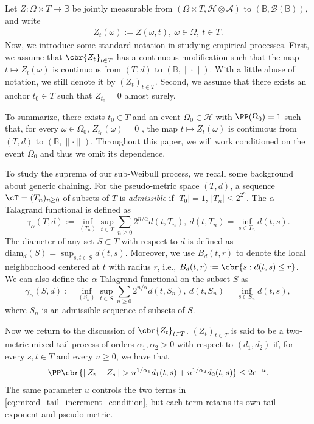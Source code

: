 \documentclass[11pt]{article}
\begin{document}
Let $Z:\Omega\times T\longrightarrow\mathbb B$ be jointly measurable
from $(\Omega\times T,\mathcal H\otimes\mathcal A)$ to
$(\mathbb B,\mathcal B(\mathbb B))$, and write
\begin{align*}
Z_t(\omega):=Z(\omega,t),
\ \omega\in\Omega,\ t\in T.
\end{align*}
Now, we introduce some standard notation in studying empirical processes. First, we assume that $\cbr{Z_t}_{t\in T}$ has a continuous modification such that the map $t\mapsto Z_t(\omega)$ is continuous from $(T,d)$ to $(\mathbb B,\|\cdot\|)$. With a little abuse of notation, we still denote it by
$(Z_t)_{t\in T}$. Second, we assume that there exists an anchor $t_0\in T$ such that $Z_{t_0}=0$ almost surely.

To summarize, there exists $t_0\in T$ and an event
$\Omega_0\in\mathcal H$ with $\PP(\Omega_0)=1$ such that, for every
$\omega\in\Omega_0$, $Z_{t_0}(\omega)=0$
, the map $t\mapsto Z_t(\omega)$ 
is continuous from $(T,d)$ to $(\mathbb B,\|\cdot\|)$. Throughout this paper, we will work conditioned on the event $\Omega_0$ and thus we omit its dependence.



To study the suprema of our sub-Weibull process, we recall some background about generic chaining.
For the pseudo-metric space $(T,d)$, a sequence $\cT=(T_n)_{n\ge 0}$ of subsets of $T$ is \emph{admissible} if $|T_0|=1$, $|T_n|\le 2^{2^n}$. The $\alpha$-Talagrand functional \citep{dirksen2015tail} is defined as
\[
\gamma_{\alpha}(T,d):=\inf_{(T_n)}\sup_{t\in T}\sum_{n\ge 0}2^{n/\alpha}d(t,T_n),\ d(t,T_n)=\inf_{s\in T_n}d(t,s).
\]
The diameter of any set $S\subset T$ with respect to $d$ is defined as $\text{diam}_d(S)=\sup_{s,t\in S}d(t,s)$. Moreover, we use $B_d(t,r)$ to denote the local neighborhood centered at $t$ with radius $r$, i.e., $B_d(t,r):=\cbr{s:d(t,s)\le r}$. We can also define the $\alpha$-Talagrand functional on the subset $S$ as $$\gamma_{\alpha}(S,d):=\inf_{(S_n)}\sup_{t\in S}\sum_{n\ge 0}2^{n/\alpha}d(t,S_n),\ d(t,S_n)=\inf_{s\in S_n}d(t,s),$$
where $S_n$ is an admissible sequence of subsets of $S$.


Now we return to the discussion of $\cbr{Z_t}_{t\in T}$.  $(Z_t)_{t\in T}$ is said to be a two-metric mixed-tail process of
orders $\alpha_1,\alpha_2>0$ with respect to $(d_1,d_2)$ if, for every
$s,t\in T$ and every $u\ge0$, we have that
\begin{align}
\PP\cbr{
\|Z_t-Z_s\|>
u^{1/\alpha_1}d_1(t,s)
+u^{1/\alpha_2}d_2(t,s)
}
\le2e^{-u}.
\label{eq:mixed_tail_increment_condition}
\end{align}
The same parameter $u$ controls the two terms in
\eqref{eq:mixed_tail_increment_condition}, but each term retains its own
tail exponent and pseudo-metric.
\end{document}
